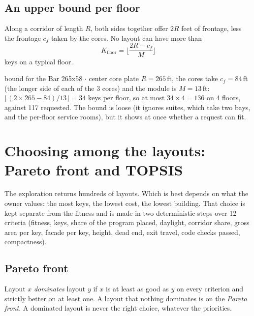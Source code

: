 \documentclass[10pt,a4paper]{article}
\begin{document}
\subsection{An upper bound per floor}
Along a corridor of length $R$, both sides together offer $2R$ feet of frontage, less the frontage $c_f$ taken by the
cores. No layout can have more than
\[ K_{\text{floor}} = \Big\lfloor \frac{2R - c_f}{M} \Big\rfloor \]
keys on a typical floor.
\begin{example}{bound for the Bar 265x58 $\cdot$ center core plate}
$R = 265$\,ft, the cores take $c_f = 84$\,ft (the longer side of each of the 3 cores) and the module
is $M = 13$\,ft: $\lfloor (2 \times 265 - 84)/13 \rfloor = 34$ keys per floor, so at most
$34 \times 4 = 136$ on 4 floors, against 117 requested. The bound is loose (it ignores suites, which
take two bays, and the per-floor service rooms), but it shows at once whether a request can fit.
\end{example}


\section{Choosing among the layouts: Pareto front and TOPSIS}\label{sec:decide}
The exploration returns hundreds of layouts. Which is best depends on what the owner values: the most keys, the lowest
cost, the lowest building. That choice is kept separate from the fitness and is made in two deterministic steps over
12 criteria (fitness, keys, share of the program placed, daylight, corridor share, gross area per key, facade
per key, height, dead end, exit travel, code checks passed, compactness).

\subsection{Pareto front}
Layout $x$ \emph{dominates} layout $y$ if $x$ is at least as good as $y$ on every criterion and strictly better on at
least one. A layout that nothing dominates is on the \emph{Pareto front}. A dominated layout is never the right
choice, whatever the priorities.
\end{document}
